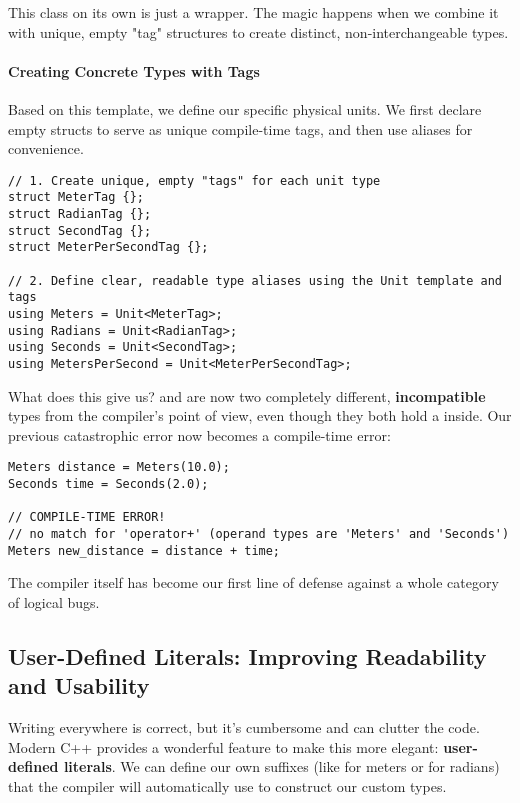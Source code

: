 This class on its own is just a wrapper. The magic happens when we combine it with unique, empty "tag" structures to create distinct, non-interchangeable types.

\paragraph{Creating Concrete Types with Tags}
Based on this template, we define our specific physical units. We first declare empty structs to serve as unique compile-time tags, and then use  aliases for convenience.

\begin{verbatim}
// 1. Create unique, empty "tags" for each unit type
struct MeterTag {};
struct RadianTag {};
struct SecondTag {};
struct MeterPerSecondTag {};

// 2. Define clear, readable type aliases using the Unit template and tags
using Meters = Unit<MeterTag>;
using Radians = Unit<RadianTag>;
using Seconds = Unit<SecondTag>;
using MetersPerSecond = Unit<MeterPerSecondTag>;
\end{verbatim}
\label{lst:unit-types}

What does this give us?  and  are now two completely different, \textbf{incompatible} types from the compiler's point of view, even though they both hold a  inside. Our previous catastrophic error now becomes a compile-time error:

\begin{verbatim}
Meters distance = Meters(10.0);
Seconds time = Seconds(2.0);

// COMPILE-TIME ERROR!
// no match for 'operator+' (operand types are 'Meters' and 'Seconds')
Meters new_distance = distance + time; 
\end{verbatim}
\label{[МЕТКА]}

The compiler itself has become our first line of defense against a whole category of logical bugs.


\subsection{User-Defined Literals: Improving Readability and Usability}
\label{subsec:user_defined_literals}

Writing  everywhere is correct, but it's cumbersome and can clutter the code. Modern C++ provides a wonderful feature to make this more elegant: \textbf{user-defined literals}. We can define our own suffixes (like  for meters or  for radians) that the compiler will automatically use to construct our custom types.


